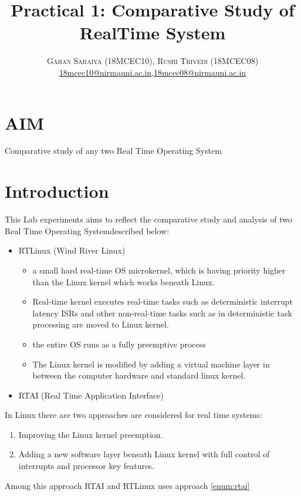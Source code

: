 \documentclass[paper=letter, fontsize=12pt]{article}
\title{\vspace{-15mm}\fontsize{24pt}{10pt}\selectfont\textbf{Practical 1: Comparative Study of RealTime System}} %
\author{
    \large
    {\textsc{Gahan Saraiya (18MCEC10), Rushi Trivedi (18MCEC08) }}\\[2mm]
    \normalsize \href{mailto:18mcec10@nirmauni.ac.in}{18mcec10@nirmauni.ac.in},\href{mailto:18mcec08@nirmauni.ac.in}{18mcec08@nirmauni.ac.in}\\[2mm] %
}
\date{}
\newcommand\rtos{Real Time Operating System}
\newcommand\rtai{Real Time Application Interface}
\begin{document}
    \maketitle %
    \thispagestyle{fancy} %
    
    \section{AIM}
    Comparative study of any two \rtos
    
    \section{Introduction}
    This Lab experiments aims to reflect the comparative study and analysis of two \rtos described below:
    \begin{itemize}
        \item RTLinux (Wind River Linux)
            \begin{itemize}
                \item a small hard real-time OS microkernel, which is having priority higher than the Linux kernel which works beneath Linux.
                \item  Real-time kernel executes real-time tasks such as deterministic interrupt latency ISRs and other non-real-time tasks such as in deterministic task processing are moved to Linux kernel.
                \item the entire OS runs as a fully preemptive process
                \item The Linux kernel is modified by adding a virtual machine layer in between the computer hardware and standard linux kernel.
            \end{itemize}
        \item RTAI (\rtai)
    \end{itemize}
    
    In Linux there are two approaches are considered for real time systems:
    \begin{enumerate}
        \item Improving the Linux kernel preemption.
        \item\label{enum:rtai} Adding a new software layer beneath Linux kernel with full control of interrupts and processor key features.
    \end{enumerate}
    
    Among this approach RTAI and RTLinux uses approach \ref{enum:rtai}
    
\end{document}
